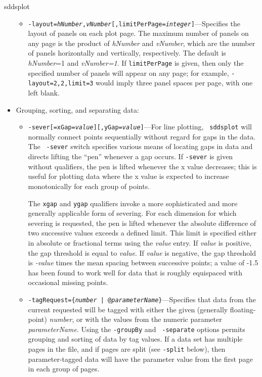 \begin{sddsprog}{sddsplot}
\begin{itemize}
\begin{itemize}
  \item {\tt -layout={\em hNumber},{\em vNumber}[,limitPerPage={\em integer}]}---Specifies the layout
of panels on each plot page.  The maximum number of panels on any page is the product of {\em
hNumber} and {\em vNumber}, which are the number of panels horizontally and vertically, respectively.
The default is {\em hNumber}=1 and {\em vNumber=1}.  If {\tt limitPerPage} is given, then only the
specified number of panels will appear on any page; for example, {\tt -layout=2,2,limit=3} would
imply three panel spaces per page, with one left blank.

  \end{itemize}

\item Grouping, sorting, and separating data:

  \begin{itemize} \item {\tt -sever[=xGap={\em value}][,yGap={\em value}]}---For line plotting, {\tt
sddsplot} will normally connect points sequentially without regard for gaps in the data.  The {\tt
-sever} switch specifies various means of locating gaps in data and directs lifting the ``pen''
whenever a gap occurs.  If {\tt -sever} is given without qualifiers, the pen is lifted whenever the x
value decreases; this is useful for plotting data where the x value is expected to increase
monotonically for each group of points.

The {\tt xgap} and {\tt ygap} qualifiers invoke a more sophisticated and more generally applicable form of
severing.  For each dimension for which severing is requested, the pen is lifted whenever the absolute
difference of two successive values exceeds a defined limit.  This limit is specified either in absolute
or fractional terms using the {\em value} entry.  If {\em value} is positive, the gap threshold is equal
to {\em value}.  If {\em value} is negative, the gap threshold is {\em -value} times the mean spacing
between successive points; a value of -1.5 has been found to work well for data that is roughly equispaced
with occasional missing points.

  \item {\tt -tagRequest=\{{\em number} | @{\em parameterName}\}}---Specifies that data from the
current requested will be tagged with either the given (generally floating-point) {\em number}, or
with the values from the numeric parameter {\em parameterName}.  Using the {\tt -groupBy} and {\tt
-separate} options permits grouping and sorting of data by tag values.  If a data set has multiple
pages in the file, and if pages are split (see {\tt -split} below), then parameter-tagged data will
have the parameter value from the first page in each group of pages.


\end{itemize}
\end{itemize}
\end{sddsprog}
